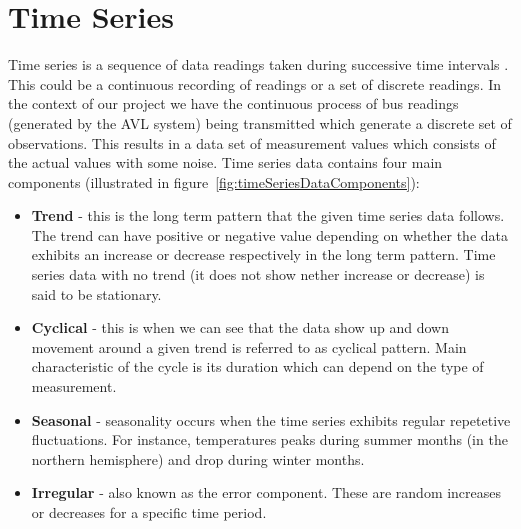 \section{Time Series}
Time series is a sequence of data readings taken during successive time intervals \cite{shumway2010time}. This could be a continuous recording of readings or a set of discrete readings. In the context of our project we have the continuous process of bus readings (generated by the AVL system) being transmitted which generate a discrete set of observations. This results in a data set of measurement values which consists of the actual values with some noise. Time series data contains four main components (illustrated in figure~\ref{fig:timeSeriesDataComponents})\cite{brockwell2002introduction}:
\begin{itemize}
	\item \textbf{Trend} - this is the long term pattern that the given time series data follows. The trend can have positive or negative value depending on whether the data exhibits an increase or decrease respectively in the long term pattern. Time series data with no trend (it does not show nether increase or decrease) is said to be stationary.
	\item \textbf{Cyclical} - this is when we can see that the data show up and down movement around a given trend is referred to as cyclical pattern. Main characteristic of the cycle is its duration which can depend on the type of measurement.
	\item \textbf{Seasonal} - seasonality occurs when the time series exhibits regular repetetive fluctuations. For instance, temperatures peaks during summer months (in the northern hemisphere) and drop during winter months.
	\item \textbf{Irregular} - also known as the error component. These are random increases or decreases for a specific time period.
\end{itemize}

